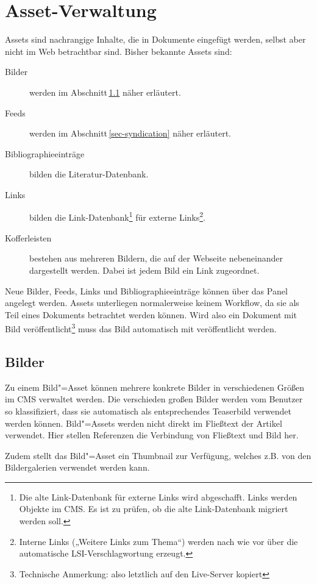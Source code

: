 %

\chapter{Asset-Verwaltung} \label{sec-assets}

Assets sind nachrangige Inhalte, die in Dokumente eingefügt werden, selbst
aber nicht im Web betrachtbar sind.  Bisher bekannte Assets sind:

\begin{description}

  \item[Bilder] werden im Abschnitt\,\ref{sec-bilder} näher erläutert.

  \item[Feeds] werden im Abschnitt\,\ref{sec-syndication} näher erläutert.
  
  \item[Bibliographieeinträge] bilden die Literatur-Datenbank.

  \item[Links] bilden die Link-Datenbank\footnote{Die alte Link-Datenbank
    für externe Links wird abgeschafft.  Links werden Objekte im CMS. Es ist
    zu prüfen, ob die alte Link-Datenbank migriert werden soll.} für externe
    Links\footnote{Interne Links („Weitere Links zum Thema“) werden nach wie
    vor über die automatische LSI-Verschlagwortung erzeugt.}.

  \item[Kofferleisten] bestehen aus mehreren Bildern, die auf der Webseite
    nebeneinander dargestellt werden. Dabei ist jedem Bild ein Link
    zugeordnet. 


\end{description}


Neue Bilder, Feeds, Links und Bibliographieeinträge können über das Panel
 angelegt werden.  Assets unterliegen
normalerweise keinem Workflow, da sie als Teil eines Dokuments betrachtet
werden können. Wird also ein Dokument mit Bild
veröffentlicht\footnote{Technische Anmerkung: also letztlich auf den
Live-Server kopiert} muss das Bild automatisch mit veröffentlicht werden.

\section{Bilder} \label{sec-bilder}

Zu einem Bild"=Asset können mehrere konkrete Bilder in verschiedenen Größen
im CMS verwaltet werden. Die verschieden großen Bilder werden vom Benutzer so
klassifiziert, dass sie automatisch als entsprechendes Teaserbild
verwendet werden können.
Bild"=Assets werden nicht direkt im Fließtext der Artikel verwendet. 
Hier stellen Referenzen die Verbindung von Fließtext und Bild her. 

Zudem stellt das Bild"=Asset ein Thumbnail zur Verfügung, welches z.B. von den
Bildergalerien verwendet werden kann.





